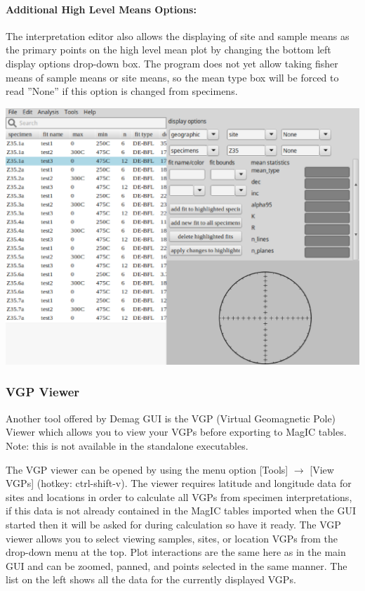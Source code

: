 \documentclass[11pt]{book}
\begin{document}
{{\paragraph{Additional High Level Means Options:}\label{IE-HLM-options} The interpretation editor also allows the displaying of site and sample means as the primary points on the high level mean plot by changing the bottom left display options drop-down box. The program does not yet allow taking fisher means of sample means or site means, so the mean type box will be forced to read ''None'' if this option is changed from specimens.

\includegraphics[width=15 cm]{EPSFiles/demag_gui_InterpEditor.eps}

\subsubsection{VGP Viewer}\label{vgp-view}

Another tool offered by Demag GUI is the VGP (Virtual Geomagnetic Pole) Viewer which allows you to view your VGPs before exporting to MagIC tables. Note: this is not available in the standalone executables.

The VGP viewer can be opened by using the menu option [Tools] $\rightarrow$ [View VGPs] (hotkey: ctrl-shift-v). The viewer requires latitude and longitude data for sites and locations in order to calculate all VGPs from specimen interpretations, if this data is not already contained in the MagIC tables imported when the GUI started then it will be asked for during calculation so have it ready. The VGP viewer allows you to select viewing samples, sites, or location VGPs from the drop-down menu at the top. Plot interactions are the same here as in the main GUI and can be zoomed, panned, and points selected in the same manner. The list on the left shows all the data for the currently displayed VGPs.

}}
\end{document}
